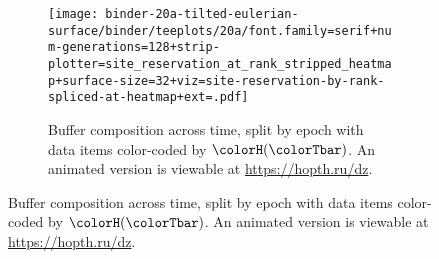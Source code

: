 \begin{figure*}[htbp!]
\begin{subfigure}[b]{\linewidth}
\texttt{[image: 
binder-20a-tilted-eulerian-surface/binder/teeplots/20a/font.family=serif+num-generations=128+strip-plotter=site\_reservation\_at\_rank\_stripped\_heatmap+surface-size=32+viz=site-reservation-by-rank-spliced-at-heatmap+ext=.pdf]}
\vspace{-4.5ex}\caption{\footnotesize
  Buffer composition across time, split by epoch with data items color-coded by \hv{} $\colorH(\colorTbar)$.
  An animated version is viewable at \url{https://hopth.ru/dz}.
}
\label{fig:hsurf-tilted-implementation-schematic}
\end{subfigure}




\end{figure*}
